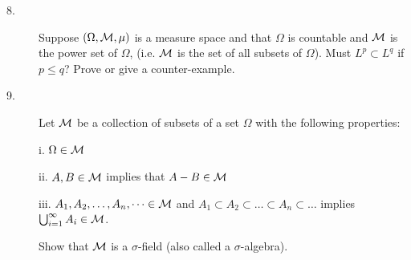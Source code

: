 \documentclass{article}
\begin{document}
\begin{description}
\item[8.]
Suppose $(\Omega, {\cal M}, \mu)$ is a measure space and that $\Omega$ is
countable and ${\cal M}$ is the power set of $\Omega$, (i.e. ${\cal M}$ is
the set of all subsets of $\Omega$). Must $L^p \subset L^q$ if
$p \leq q$? Prove or give a counter-example.

\item[9.]
Let ${\cal M}$ be a collection of subsets of a set $\Omega$ with the
following properties:

\item[\quad] i.
$\Omega \in {\cal M}$

\item[\quad] ii.
$A, B \in {\cal M}$ implies that $A-B \in {\cal M}$

\item[\quad] iii.
$A_1, A_2, \dots, A_n, \dots \in {\cal M}$ and
$A_1 \subset A_2 \subset \dots \subset A_n \subset \dots$
implies $\bigcup^\infty_{i=1} A_i \in {\cal M}$.

Show that ${\cal M}$ is a $\sigma$-field (also called a $\sigma$-algebra).





\end{description}    
\end{document}
